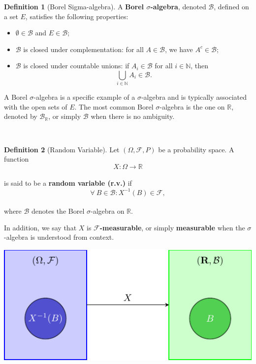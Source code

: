 \documentclass[
  11pt,
  a4paper,
]{book}
\theoremstyle{definition}
\newtheorem{definition}{Definition}[chapter]
\theoremstyle{definition}
\theoremstyle{definition}
\theoremstyle{definition}
\theoremstyle{remark}
\begin{document}
\begin{definition}[Borel Sigma-algebra]
A \textbf{Borel \(\sigma\)-algebra}, denoted \(\mathcal{B}\), defined on a set \(E\), satisfies the following properties:

\begin{itemize}
\item
  \(\emptyset \in \mathcal{B}\) and \(E \in \mathcal{B}\);
\item
  \(\mathcal{B}\) is closed under complementation: for all \(A \in \mathcal{B}\), we have \(A^c \in \mathcal{B}\);
\item
  \(\mathcal{B}\) is closed under countable unions: if \(A_i \in \mathcal{B}\) for all \(i \in \mathbb{N}\), then\\
  \[
  \bigcup\limits_{i \in \mathbb{N}} A_i \in \mathcal{B}.
  \]
\end{itemize}

A Borel \(\sigma\)-algebra is a specific example of a \(\sigma\)-algebra and is typically associated with the open sets of \(E\). The most common Borel \(\sigma\)-algebra is the one on \(\mathbb{R}\), denoted by \(\mathcal{B}_{\mathbb{R}}\), or simply \(\mathcal{B}\) when there is no ambiguity.
\end{definition}

\(\,\)

\begin{definition}[Random Variable]

Let \((\Omega, \mathcal{F}, P)\) be a probability space. A function\\
\[
X: \Omega \rightarrow \mathbb{R}
\]\\
is said to be a \textbf{random variable (r.v.)} if\\
\[
\forall ~ B \in \mathcal{B}: X^{-1}(B) \in \mathcal{F},
\]\\
where \(\mathcal{B}\) denotes the Borel \(\sigma\)-algebra on \(\mathbb{R}\).

In addition, we say that \(X\) is \textbf{\(\mathcal{F}\)-measurable}, or simply \textbf{measurable} when the \(\sigma\)-algebra is understood from context.

\begin{center}\includegraphics[width=0.6\linewidth]{_main_files/figure-latex/fig0-1} \end{center}

\end{definition}
\end{document}
